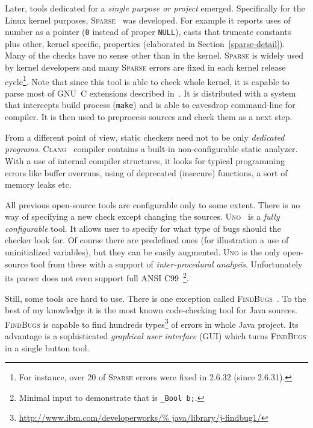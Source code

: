 \documentclass[11pt,a4paper]{article}
\begin{document}
\label{sparse}
Later, tools dedicated for a \emph{single purpose or project} emerged.
Specifically for the Linux kernel purposes, \textsc{Sparse}~\cite{sparse} was
developed.  For example it reports uses of number as a pointer (\texttt{0}
instead of proper \texttt{NULL}), casts that truncate constants plus other,
kernel specific, properties (elaborated in Section~\ref{sparse-detail}). Many
of the checks have no sense other than in the kernel. \textsc{Sparse} is
widely used by kernel developers and many \textsc{Sparse} errors are fixed in
each kernel release cycle\footnote{For instance, over 20 of \textsc{Sparse}
errors were fixed in 2.6.32 (since 2.6.31).}. Note that since this tool is
able to check whole kernel, it is capable to parse most of GNU~C extensions
described in~\cite{gcc}. It is distributed with a system that intercepts build
process (\texttt{make}) and is able to eavesdrop command-line for compiler. It
is then used to preprocess sources and check them as a next step.

From a different point of view, static checkers need not to be only
\emph{dedicated programs}. \textsc{Clang}~\cite{clang} compiler contains a
built-in non-configurable static analyzer. With a use of internal compiler
structures, it looks for typical programming errors like buffer overruns,
using of deprecated (insecure) functions, a sort of memory leaks etc.

All previous open-source tools are configurable only to some extent. There is
no way of specifying a new check except changing the sources.
\textsc{Uno}~\cite{uno} is a \emph{fully configurable} tool. It allows user to
specify for what type of bugs should the checker look for. Of course there are
predefined ones (for illustration a use of uninitialized variables), but they
can be easily augmented. \textsc{Uno} is the only open-source tool from these
with a support of \emph{inter-procedural analysis}. Unfortunately its parser
does not even support full ANSI C99~\cite{ansi_c}\footnote{Minimal input to
demonstrate that is \texttt{\_Bool b;}.}.

Still, some tools are hard to use. There is one exception called
\textsc{FindBugs}~\cite{findbugs}. To the best of my knowledge it is the most
known code-checking tool for Java sources. \textsc{FindBugs} is capable to
find hundreds types\footnote{\url{http://www.ibm.com/developerworks/%
java/library/j-findbug1/}} of errors in whole Java project. Its advantage is a
sophisticated \emph{graphical user interface} (GUI) which turns
\textsc{FindBugs} in a single button tool.
\end{document}
